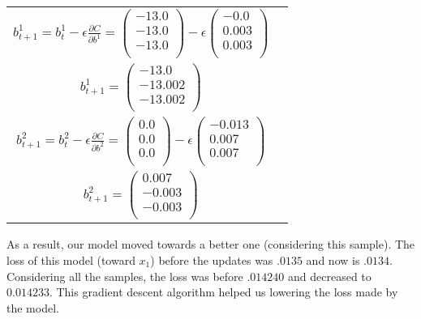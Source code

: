 \begin{tabular}{cc}
				\hline
				$ b^1_{t+1} = b^1_t - \epsilon \frac{\partial C}{\partial b^1} = 
					\left( \begin{matrix}
					-13.0 \\
					-13.0 \\
					-13.0 \\
					\end{matrix} \right) - \epsilon 
					\left( \begin{matrix}
					-0.0 \\
					0.003 \\
					0.003 \\
					\end{matrix} \right)$ \\
				$ b^1_{t+1} = 
					\left( \begin{matrix}
					-13.0 \\
					-13.002 \\
					-13.002 \\
					\end{matrix} \right)$ \\

				\hline
 				$ b^2_{t+1} = b^2_t - \epsilon \frac{\partial C}{\partial b^2} = 
					\left( \begin{matrix}
					0.0 \\
					0.0 \\
					0.0 \\
					\end{matrix} \right) - \epsilon 
					\left( \begin{matrix}
					-0.013 \\
					0.007 \\
					0.007 \\
					\end{matrix} \right)$ \\
				$ b^2_{t+1} = 
					\left( \begin{matrix}
					0.007 \\
					-0.003 \\
					-0.003 \\
					\end{matrix} \right)$ \\
			\end{tabular}

			As a result, our model moved towards a better one (considering this sample). The loss of this model (toward $x_1$) before the updates was $.0135$ and now is $.0134$. Considering all the samples, the loss was before $.014240$ and decreased to $0.014233$. This gradient descent algorithm helped us lowering the loss made by the model.